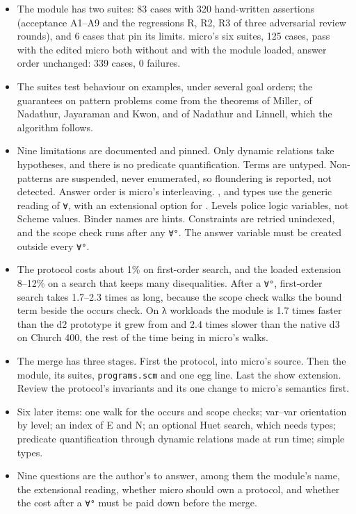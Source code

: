 \begin{itemize}
  \item The module has two suites: 83 cases with 320 hand-written assertions (acceptance A1--A9 and the
    regressions R, R2, R3 of three adversarial review rounds), and 6 cases that pin its limits. micro's six
    suites, 125 cases, pass with the edited micro both without and with the module loaded, answer order
    unchanged: 339 cases, 0 failures.
  \item The suites test behaviour on examples, under several goal orders; the guarantees on pattern
    problems come from the theorems of Miller, of Nadathur, Jayaraman and Kwon, and of Nadathur and
    Linnell, which the algorithm follows.
  \item Nine limitations are documented and pinned. Only dynamic relations take hypotheses, and there is
    no predicate quantification. Terms are untyped. Non-patterns are suspended, never enumerated, so
    floundering is reported, not detected. Answer order is micro's interleaving. ,
     and types use the generic reading of \texttt{∀}, with an extensional option for
    . Levels police logic variables, not Scheme values. Binder names are hints. Constraints are
    retried unindexed, and the scope check runs after any \texttt{∀°}. The answer variable must be
    created outside every \texttt{∀°}.
  \item The protocol costs about 1\% on first-order search, and the loaded extension 8--12\% on a
    search that keeps many disequalities. After a \texttt{∀°}, first-order search takes 1.7--2.3 times as long,
    because the scope check walks the bound term beside the occurs check. On λ workloads the module is
    1.7 times faster than the d2 prototype it grew from and 2.4 times slower than the native d3 on
    Church 400, the rest of the time being in micro's walks.
  \item The merge has three stages. First the protocol, into micro's source. Then the module, its
    suites, \texttt{programs.scm} and one egg line. Last the show extension. Review the protocol's invariants
    and its one change to micro's semantics first.
  \item Six later items: one walk for the occurs and scope checks; var--var orientation by level; an
    index of E and N; an optional Huet search, which needs types; predicate quantification through dynamic
    relations made at run time; simple types.
  \item Nine questions are the author's to answer, among them the module's name, the extensional reading,
    whether micro should own a protocol, and whether the cost after a \texttt{∀°} must be paid down before
    the merge.
\end{itemize}

